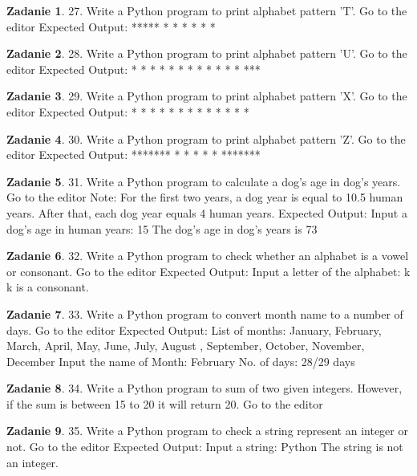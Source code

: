 \documentclass[11pt]{article}
\theoremstyle{definition}
\newtheorem{zadanie}{Zadanie}
\begin{document}
\begin{zadanie}
27. Write a Python program to print alphabet pattern 'T'. Go to the editor
Expected Output:
*****
*
*
*
*
*
*
\end{zadanie}

\begin{zadanie}
28. Write a Python program to print alphabet pattern 'U'. Go to the editor
Expected Output:
*   *
*   *
*   *
*   *
*   *
*   *
***
\end{zadanie}

\begin{zadanie}
29. Write a Python program to print alphabet pattern 'X'. Go to the editor
Expected Output:
*   *
*   *
* *
*
* *
*   *
*   *
\end{zadanie}

\begin{zadanie}
30. Write a Python program to print alphabet pattern 'Z'. Go to the editor
Expected Output:
*******
*
*
*
*
*
*******
\end{zadanie}

\begin{zadanie}
31. Write a Python program to calculate a dog's age in dog's years. Go to the editor
Note: For the first two years, a dog year is equal to 10.5 human years. After that, each dog year equals 4 human years.
Expected Output:
Input a dog's age in human years: 15
The dog's age in dog's years is 73
\end{zadanie}

\begin{zadanie}
32. Write a Python program to check whether an alphabet is a vowel or consonant. Go to the editor
Expected Output:
Input a letter of the alphabet: k
k is a consonant.
\end{zadanie}

\begin{zadanie}
33. Write a Python program to convert month name to a number of days. Go to the editor
Expected Output:
List of months: January, February, March, April, May, June, July, August
, September, October, November, December
Input the name of Month: February
No. of days: 28/29 days
\end{zadanie}

\begin{zadanie}
34. Write a Python program to sum of two given integers. However, if the sum is between 15 to 20 it will return 20. Go to the editor
\end{zadanie}

\begin{zadanie}
35. Write a Python program to check a string represent an integer or not. Go to the editor
Expected Output:
Input a string: Python
The string is not an integer.
\end{zadanie}
\end{document}
